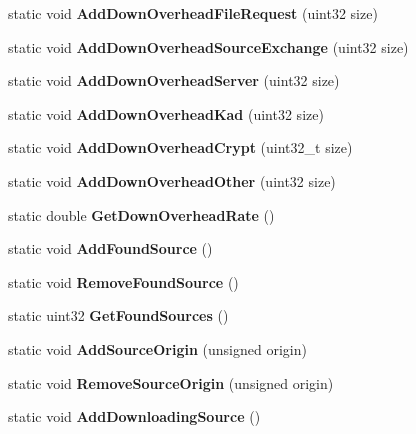 \begin{DoxyCompactItemize}
\item 
static void {\bfseries AddDownOverheadFileRequest} (uint32 size)\label{classCStatistics_a0bff32f12fe14db7d82c81b645abe561}

\item 
static void {\bfseries AddDownOverheadSourceExchange} (uint32 size)\label{classCStatistics_aa52c7613445f2ffd3311b55dae5dc55f}

\item 
static void {\bfseries AddDownOverheadServer} (uint32 size)\label{classCStatistics_a3895f77394861ac8d3222f2b25218ebc}

\item 
static void {\bfseries AddDownOverheadKad} (uint32 size)\label{classCStatistics_a1721c68ee0ecbffe41031d19adf8df2f}

\item 
static void {\bfseries AddDownOverheadCrypt} (uint32\_\-t size)\label{classCStatistics_ae940af12156061896c4b2dd3d8175b7a}

\item 
static void {\bfseries AddDownOverheadOther} (uint32 size)\label{classCStatistics_ade22fb44489c9de2d5885ddee428d4f9}

\item 
static double {\bfseries GetDownOverheadRate} ()\label{classCStatistics_a514eca140047e71d8edab4b7fc3d1da0}

\item 
static void {\bfseries AddFoundSource} ()\label{classCStatistics_ae6c30c4197f413067904c322cae1aa16}

\item 
static void {\bfseries RemoveFoundSource} ()\label{classCStatistics_aadb835f4f7c20256f1d2bbdd65ff27c9}

\item 
static uint32 {\bfseries GetFoundSources} ()\label{classCStatistics_ac7716a6ad5c934eda2853dc23047d728}

\item 
static void {\bfseries AddSourceOrigin} (unsigned origin)\label{classCStatistics_ad2b4d946a2503ef5c91c8df56943628f}

\item 
static void {\bfseries RemoveSourceOrigin} (unsigned origin)\label{classCStatistics_ab87ec653a36ea161e01163e3fe4ccd28}

\item 
static void {\bfseries AddDownloadingSource} ()\label{classCStatistics_a7b946c87efe5cb06dc2f102a7e91ee8f}


\end{DoxyCompactItemize}
